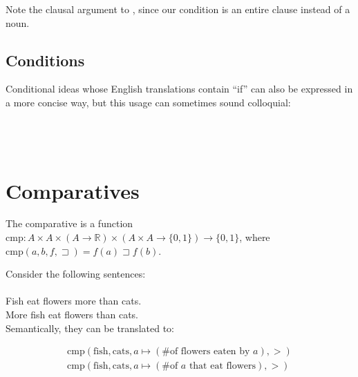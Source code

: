 \documentclass{book}
\begin{document}
Note the clausal argument to , since our condition is an entire clause instead of a noun.

\subsection{Conditions}

Conditional ideas whose English translations contain ``if'' can also be expressed in a more concise way, but this usage can sometimes sound colloquial: \\
~\\
 \\
  \\
 

\section{Comparatives}

The comparative is a function $\text{cmp}: A \times A \times (A \rightarrow \mathbb{R}) \times (A \times A \rightarrow \{0, 1\}) \rightarrow \{0, 1\}$, where $\text{cmp}(a, b, f, \sqsupset) = f(a) \sqsupset f(b)$.

Consider the following sentences: \\
~\\
Fish eat flowers more than cats. \\
More fish eat flowers than cats. \\

Semantically, they can be translated to:

\begin{gather}
    \text{cmp}(\text{fish}, \text{cats}, a \mapsto (\text{\# of flowers eaten by } a), >) \\
    \text{cmp}(\text{fish}, \text{cats}, a \mapsto (\text{\# of } a \text{ that eat flowers}), >)
\end{gather}
\end{document}
